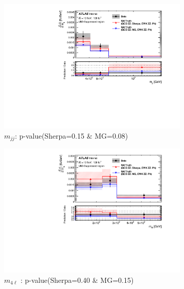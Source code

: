 \begin{figure}[!htb]
    \centering
    \begin{subfigure}{.49\textwidth}
        \centering
        \includegraphics[width=.98\linewidth]{figures/Results/CrossSection_VBSSuppressed/xs_mjj_CR.pdf}
        \caption{ \footnotesize{$m_{jj}$}: p-value(Sherpa=0.15 $\&$ MG=0.08)}
    \end{subfigure}
    \begin{subfigure}{.49\textwidth}
        \centering
        \includegraphics[width=.98\linewidth]{figures/Results/CrossSection_VBSSuppressed/xs_m4l_CR.pdf}
        \caption{ \footnotesize{$m_{4\ell}$ }: p-value(Sherpa=0.40 $\&$ MG=0.15)}
    \end{subfigure}\\
    \begin{subfigure}{.49\textwidth}

\end{subfigure}
\end{figure}
